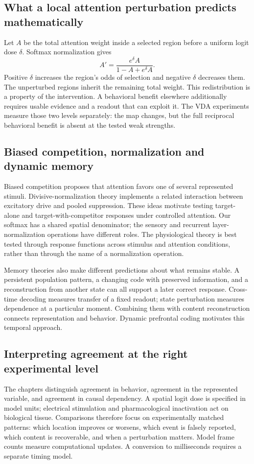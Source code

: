 \documentclass[11pt]{article}
\begin{document}
\subsection{What a local attention perturbation predicts mathematically}
Let $A$ be the total attention weight inside a selected region before a uniform logit dose $\delta$. Softmax normalization gives
\[
A'=\frac{e^\delta A}{1-A+e^\delta A}.
\]
Positive $\delta$ increases the region's odds of selection and negative $\delta$ decreases them. The unperturbed regions inherit the remaining total weight. This redistribution is a property of the intervention. A behavioral benefit elsewhere additionally requires usable evidence and a readout that can exploit it. The VDA experiments measure those two levels separately: the map changes, but the full reciprocal behavioral benefit is absent at the tested weak strengths.

\subsection{Biased competition, normalization and dynamic memory}
Biased competition proposes that attention favors one of several represented stimuli. Divisive-normalization theory implements a related interaction between excitatory drive and pooled suppression. These ideas motivate testing target-alone and target-with-competitor responses under controlled attention. Our softmax has a shared spatial denominator; the sensory and recurrent layer-normalization operations have different roles. The physiological theory is best tested through response functions across stimulus and attention conditions, rather than through the name of a normalization operation. \cite{bio_competition,bio_normalization}

Memory theories also make different predictions about what remains stable. A persistent population pattern, a changing code with preserved information, and a reconstruction from another state can all support a later correct response. Cross-time decoding measures transfer of a fixed readout; state perturbation measures dependence at a particular moment. Combining them with content reconstruction connects representation and behavior. Dynamic prefrontal coding motivates this temporal approach. \cite{bio_stokes}

\subsection{Interpreting agreement at the right experimental level}
The chapters distinguish agreement in behavior, agreement in the represented variable, and agreement in causal dependency. A spatial logit dose is specified in model units; electrical stimulation and pharmacological inactivation act on biological tissue. Comparisons therefore focus on experimentally matched patterns: which location improves or worsens, which event is falsely reported, which content is recoverable, and when a perturbation matters. Model frame counts measure computational updates. A conversion to milliseconds requires a separate timing model.
\end{document}
